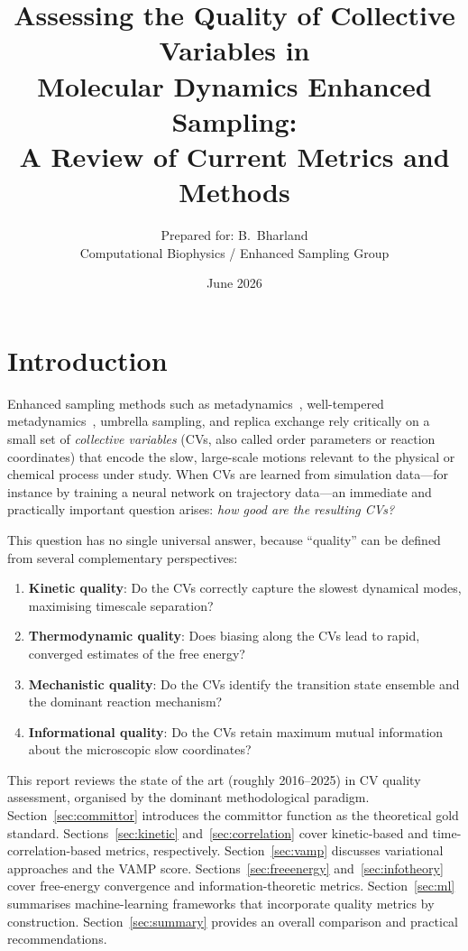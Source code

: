 \documentclass[12pt, a4paper]{article}
\title{\textbf{Assessing the Quality of Collective Variables in\\
Molecular Dynamics Enhanced Sampling:\\
A Review of Current Metrics and Methods}}
\author{Prepared for: B.~Bharland\\[6pt]
\small Computational Biophysics / Enhanced Sampling Group}
\date{June 2026}
\begin{document}
\maketitle
\tableofcontents
\newpage

\section{Introduction}

Enhanced sampling methods such as metadynamics~\citep{Laio2002}, 
well-tempered metadynamics~\citep{Barducci2008}, 
umbrella sampling, and replica exchange rely critically on a small set 
of \emph{collective variables} (CVs, also called order parameters or 
reaction coordinates) that encode the slow, large-scale motions 
relevant to the physical or chemical process under study.  When CVs are 
learned from simulation data---for instance by training a neural network 
on trajectory data---an immediate and practically important question 
arises: \textit{how good are the resulting CVs?}

This question has no single universal answer, because ``quality'' can be 
defined from several complementary perspectives:
\begin{enumerate}[noitemsep]
  \item \textbf{Kinetic quality}: Do the CVs correctly capture the slowest 
        dynamical modes, maximising timescale separation?
  \item \textbf{Thermodynamic quality}: Does biasing along the CVs lead to 
        rapid, converged estimates of the free energy?
  \item \textbf{Mechanistic quality}: Do the CVs identify the transition 
        state ensemble and the dominant reaction mechanism?
  \item \textbf{Informational quality}: Do the CVs retain maximum mutual 
        information about the microscopic slow coordinates?
\end{enumerate}

This report reviews the state of the art (roughly 2016--2025) in CV 
quality assessment, organised by the dominant methodological paradigm.  
Section~\ref{sec:committor} introduces the committor function as the 
theoretical gold standard.  Sections~\ref{sec:kinetic} 
and~\ref{sec:correlation} cover kinetic-based and time-correlation-based 
metrics, respectively.  Section~\ref{sec:vamp} discusses variational 
approaches and the VAMP score.  Sections~\ref{sec:freeenergy} 
and~\ref{sec:infotheory} cover free-energy convergence and 
information-theoretic metrics.  Section~\ref{sec:ml} summarises 
machine-learning frameworks that incorporate quality metrics by 
construction.  Section~\ref{sec:summary} provides an overall comparison 
and practical recommendations.
\end{document}
